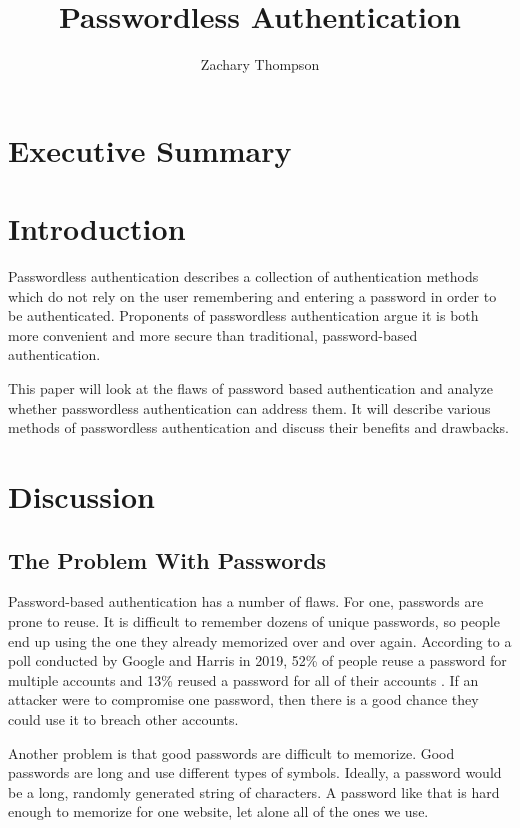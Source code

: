 \documentclass[12pt, letterpaper]{article}
\title{Passwordless Authentication}
\author{Zachary Thompson}
\begin{document}
\maketitle

\section{Executive Summary}

\newpage
\section{Introduction}
Passwordless authentication describes a collection of authentication methods which do not rely on the user remembering and entering a password in order to be authenticated.
Proponents of passwordless authentication argue it is both more convenient and more secure than traditional, password-based authentication.

This paper will look at the flaws of password based authentication and analyze whether passwordless authentication can address them.
It will describe various methods of passwordless authentication and discuss their benefits and drawbacks.

\newpage
\section{Discussion}

\subsection{The Problem With Passwords}
Password-based authentication has a number of flaws.
For one, passwords are prone to reuse.
It is difficult to remember dozens of unique passwords, so people end up using the one they already memorized over and over again.
According to a poll conducted by Google and Harris in 2019, 52\% of people reuse a password for multiple accounts and 13\% reused a password for all of their accounts \parencite{googleharris2019poll}.
If an attacker were to compromise one password, then there is a good chance they could use it to breach other accounts.

Another problem is that good passwords are difficult to memorize.
Good passwords are long and use different types of symbols.
Ideally, a password would be a long, randomly generated string of characters.
A password like that is hard enough to memorize for one website, let alone all of the ones we use.
\end{document}
